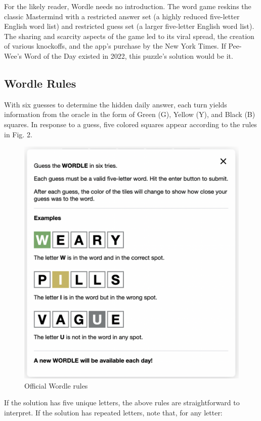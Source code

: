 \documentclass[11pt, oneside]{article} 	%
\begin{document}
For the likely reader, Wordle needs no introduction. The word game reskins the classic Mastermind with a restricted answer set (a highly reduced five-letter English word list) and restricted guess set (a larger five-letter English word list). The sharing and scarcity aspects of the game led to its viral spread, the creation of various knockoffs, and the app's purchase by the New York Times. If Pee-Wee's Word of the Day existed in 2022, this puzzle's solution would be it.

\subsection{Wordle Rules}
With six guesses to determine the hidden daily answer, each turn yields information from the oracle in the form of Green (G), Yellow (Y), and Black (B) squares. In response to a guess, five colored squares appear according to the rules in Fig. 2.


\begin{figure}
\centering
\includegraphics[scale=.5]{rules}
\caption{Official Wordle rules}
\end{figure}



If the solution has five unique letters, the above rules are straightforward to interpret. If the solution has repeated letters, note that, for any letter:
\end{document}
